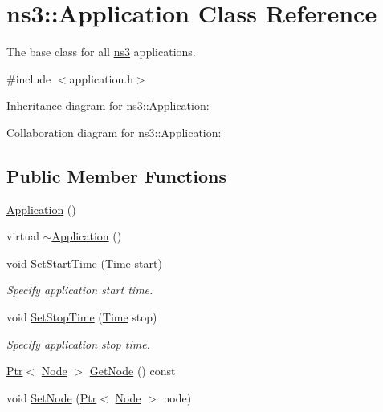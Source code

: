 \hypertarget{classns3_1_1Application}{}\section{ns3\+:\+:Application Class Reference}
\label{classns3_1_1Application}


The base class for all \hyperlink{namespacens3}{ns3} applications.  




{\ttfamily \#include $<$application.\+h$>$}



Inheritance diagram for ns3\+:\+:Application\+:


Collaboration diagram for ns3\+:\+:Application\+:
\subsection*{Public Member Functions}
\begin{DoxyCompactItemize}
\item 
\hyperlink{classns3_1_1Application_acd261926c72b02cdb48fc7f8838ee173}{Application} ()
\item 
virtual \hyperlink{classns3_1_1Application_a2840b091a190180f010d96d99e52e22f}{$\sim$\+Application} ()
\item 
void \hyperlink{classns3_1_1Application_a8360a49748e30c52ffdcc7a305c3cd48}{Set\+Start\+Time} (\hyperlink{classns3_1_1Time}{Time} start)
\begin{DoxyCompactList}\small\item\em Specify application start time. \end{DoxyCompactList}\item 
void \hyperlink{classns3_1_1Application_a732c1fdadf0be176c753a2ce6e27dff9}{Set\+Stop\+Time} (\hyperlink{classns3_1_1Time}{Time} stop)
\begin{DoxyCompactList}\small\item\em Specify application stop time. \end{DoxyCompactList}\item 
\hyperlink{classns3_1_1Ptr}{Ptr}$<$ \hyperlink{classns3_1_1Node}{Node} $>$ \hyperlink{classns3_1_1Application_a664b15088389bec8e35b35742138f097}{Get\+Node} () const 
\item 
void \hyperlink{classns3_1_1Application_a2cab718227b06a7ea643282c807aed93}{Set\+Node} (\hyperlink{classns3_1_1Ptr}{Ptr}$<$ \hyperlink{classns3_1_1Node}{Node} $>$ node)
\end{DoxyCompactItemize}
